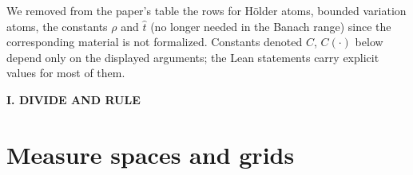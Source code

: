 \documentclass[11pt]{amsart}
\theoremstyle{definition}
\begin{document}
We removed from the paper's table the rows for H\"older atoms, bounded
variation atoms, the constants $\rho$ and $\hat t$ (no longer needed in the
Banach range) since the corresponding material is not formalized. Constants
denoted $C$, $C(\cdot)$ below depend only on the displayed arguments; the Lean
statements carry explicit values for most of them.

\vspace{8mm}
\centerline{\Large\bf I. DIVIDE AND RULE}
\vspace{6mm}

\begin{center}
\end{center}
\vspace{4mm}

\section{Measure spaces and grids}\label{partition}
\end{document}
